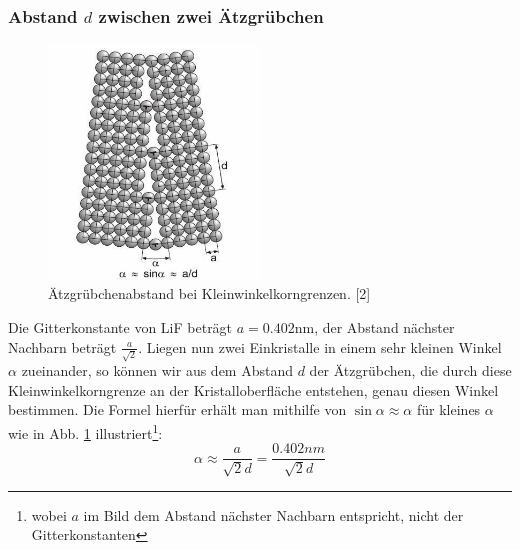 	    \subsubsection*{Abstand $d$ zwischen zwei Ätzgrübchen}

		\begin{figure}[H]
	            \centering
	            \includegraphics[width=0.5\textwidth]{Images/Korn.JPG}
	            \caption{Ätzgrübchenabstand bei Kleinwinkelkorngrenzen. [2]}
	            \label{FigKorn}
	        \end{figure}
		Die Gitterkonstante von LiF beträgt $a = 0.402$nm, der Abstand nächster Nachbarn beträgt $\frac{a}{\sqrt{2}}$. Liegen nun zwei Einkristalle in einem sehr kleinen Winkel $\alpha$ zueinander, so können wir aus dem Abstand $d$ der 
		Ätzgrübchen, die durch diese Kleinwinkelkorngrenze an der Kristalloberfläche entstehen, genau diesen Winkel bestimmen. Die Formel hierfür erhält man mithilfe
		von $\sin{\alpha} \approx \alpha$ für kleines $\alpha$ wie in Abb. \ref{FigKorn} illustriert\footnote{wobei $a$ im Bild dem Abstand nächster Nachbarn entspricht, nicht der Gitterkonstanten}:
		\begin{equation}
			\alpha \approx \frac{a}{\sqrt{2}d} = \frac{0.402nm}{\sqrt{2}d}
		\end{equation}


